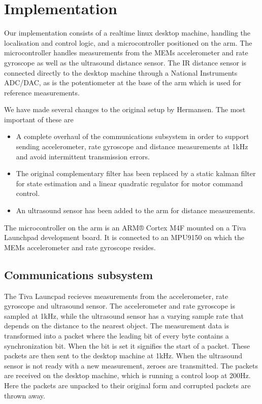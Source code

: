 \section{Implementation}
Our implementation consists of a realtime linux desktop machine, handling the localisation and control logic, and a microcontroller
positioned on the arm. The microcontroller handles measurements from the MEMs accelerometer and rate gyroscope as well as the ultrasound
distance sensor. The IR distance sensor is connected directly to the desktop machine through a National Instruments ADC/DAC, as is the 
potentiometer at the base of the arm which is used for reference measurements.

We have made several changes to the original setup by Hermansen. The most important of these are

\begin{itemize}
		\item A complete overhaul of the communications subsystem in order to support sending accelerometer, rate gyroscope and 
			distance measurements at 1kHz and avoid intermittent transmission errors. 
		\item The original complementary filter has been replaced by a static kalman filter for state estimation and a linear 
			quadratic regulator for motor command control.
			\item An ultrasound sensor has been added to the arm for distance measurements.
\end{itemize}

The microcontroller on the arm is an ARM® Cortex M4F mounted on a Tiva Launchpad development board.
It is connected to an MPU9150 on which the MEMs accelerometer and rate gyroscope resides.

\subsection{Communications subsystem}
The Tiva Launcpad recieves measurements from the accelerometer, rate gyroscope and ultrasound sensor. The accelerometer and 
rate gyroscope is sampled at 1kHz, while the ultrasound sensor has a varying sample rate that depends on the distance to the nearest
object. The measurement data is transformed into a packet where the leading bit of every byte contains a synchronization bit. When
the bit is set it signifies the start of a packet. These packets are then sent to the desktop machine at 1kHz. When the ultrasound 
sensor is not ready with a new measurement, zeroes are transmitted. The packets are received on the desktop machine, which is 
running a control loop at 200Hz. Here the packets are unpacked to their original form and corrupted packets are thrown away.
